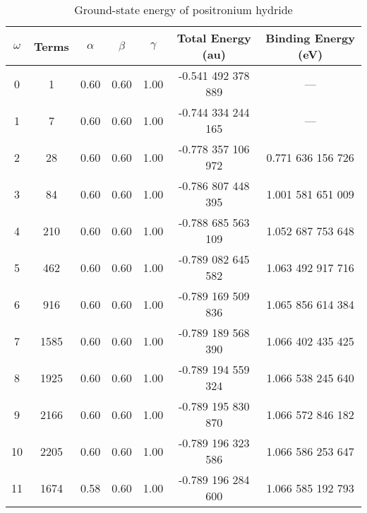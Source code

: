 \documentclass[Dissertation.tex]{subfiles}
\begin{document}
\setlength{\abovecaptionskip}{6pt}   %
\setlength{\belowcaptionskip}{6pt}   %
\begin{table}[H]
\centering
\begin{tabular}{c c c c c c c}
\toprule
$\omega$ & Terms & $\alpha$ & $\beta$ & $\gamma$ & Total Energy (au) & Binding Energy (eV) \\ [0.5ex]
\midrule
0 & 1 & 0.60 & 0.60 & 1.00 & -0.541 492 378 889 & --- \\
1 & 7 & 0.60 & 0.60 & 1.00 & -0.744 334 244 165 & --- \\
2 & 28 & 0.60 & 0.60 & 1.00 & -0.778 357 106 972 & 0.771 636 156 726 \\
3 & 84 & 0.60 & 0.60 & 1.00 & -0.786 807 448 395 & 1.001 581 651 009 \\
4 & 210 & 0.60 & 0.60 & 1.00 & -0.788 685 563 109 & 1.052 687 753 648 \\
5 & 462 & 0.60 & 0.60 & 1.00 & -0.789 082 645 582 & 1.063 492 917 716 \\
6 & 916 & 0.60 & 0.60 & 1.00 & -0.789 169 509 836 & 1.065 856 614 384 \\
7 & 1585 & 0.60 & 0.60 & 1.00 & -0.789 189 568 390 & 1.066 402 435 425 \\
8 & 1925 & 0.60 & 0.60 & 1.00 & -0.789 194 559 324 & 1.066 538 245 640 \\
9 & 2166 & 0.60 & 0.60 & 1.00 & -0.789 195 830 870 & 1.066 572 846 182 \\
10 & 2205 & 0.60 & 0.60 & 1.00 & -0.789 196 323 586 & 1.066 586 253 647 \\
11 & 1674 & 0.58 & 0.60 & 1.00 & -0.789 196 284 600 & 1.066 585 192 793 \\
\bottomrule
\end{tabular}
\caption{Ground-state energy of positronium hydride} %
\label{tab:BoundEnergyOld}
\end{table}
\end{document}
